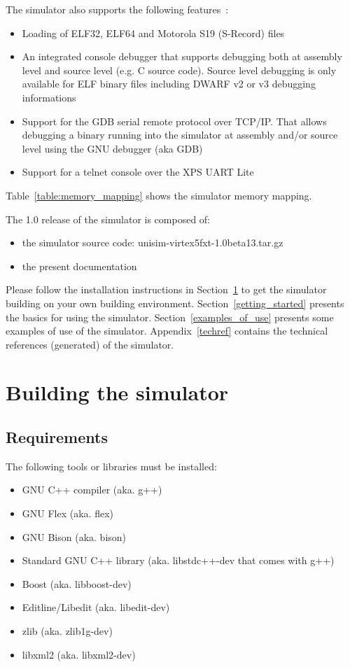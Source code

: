 \cleardoublepage

\noindent The simulator also supports the following features :
\begin{itemize}
\item Loading of ELF32, ELF64 \cite{ELF} and Motorola S19 (S-Record) \cite{S19} files
\item An integrated console debugger that supports debugging both at assembly level and source level (e.g. C source code). Source level debugging is only available for ELF binary files including DWARF v2 or v3 \cite{DWARF3} debugging informations
\item Support for the GDB \cite{GDB} serial remote protocol over TCP/IP. That allows debugging a binary running into the simulator at assembly and/or source level using the GNU debugger (aka GDB)
\item Support for a telnet console over the XPS UART Lite
\end{itemize}

Table~\ref{table:memory_mapping} shows the simulator memory mapping.

\noindent The 1.0 release of the simulator is composed of:
\begin{itemize}
\item the simulator source code: unisim-virtex5fxt-1.0beta13.tar.gz
\item the present documentation
\end{itemize}

Please follow the installation instructions in Section~\ref{building_simulator} to get the simulator building on your own building environment.
Section~\ref{getting_started} presents the basics for using the simulator.
Section~\ref{examples_of_use} presents some examples of use of the simulator.
Appendix~\ref{techref} contains the technical references (generated) of the simulator.

\section{Building the simulator}
\label{building_simulator}

\subsection{Requirements}

\noindent The following tools or libraries must be installed:
\begin{itemize}
\item GNU C++ compiler (aka. g++)
\item GNU Flex (aka. flex)
\item GNU Bison (aka. bison)
\item Standard GNU C++ library (aka. libstdc++-dev that comes with g++)
\item Boost (aka. libboost-dev)
\item Editline/Libedit (aka. libedit-dev)
\item zlib (aka. zlib1g-dev)
\item libxml2 (aka. libxml2-dev)
\end{itemize}

